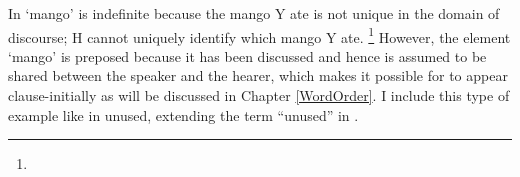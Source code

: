In \Last `mango' is indefinite because the mango Y ate is not unique in the domain of discourse; H cannot uniquely identify which mango Y ate.%
 \footnote{
 }
However, the element  `mango' is preposed because it has been discussed and hence is assumed to be shared between the speaker and the hearer,
which makes it possible for  to appear clause-initially as will be discussed in Chapter \ref{WordOrder}.
%
I include this type of example like  in unused,
extending the term ``unused'' in .

